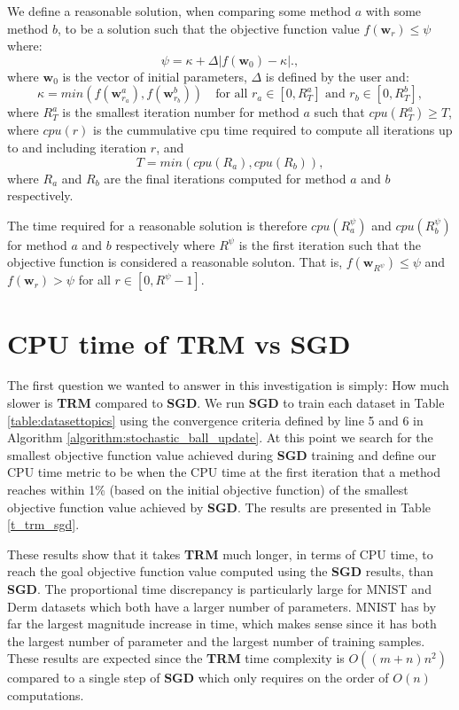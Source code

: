 \documentclass[letterpaper,12pt,titlepage,oneside,final]{book}
\begin{document}
	We define a reasonable solution, when comparing some method $a$ with some method $b$, to be a solution such that the objective function value $f(\mathbf{w}_{r}) \leq \psi$ where:
	\begin{equation}
	\psi = \kappa +  \Delta|f(\mathbf{w}_{0}) - \kappa|.,
	\end{equation}
	where $\mathbf{w}_{0}$ is the vector of initial parameters,  $\Delta$ is defined by the user and:
	\begin{equation}
	\kappa = min(f(\mathbf{w}^{a}_{r_{a}}),f(\mathbf{w}^{b}_{r_{b}})) \quad \text{for all } r_{a} \in [0,R^{a}_{T}] \text{ and } r_{b} \in [0,R^{b}_{T}],
	\end{equation}
	where $R^{a}_{T}$ is the smallest iteration number for method $a$ such that $cpu(R^{a}_{T}) \geq T$, where $cpu(r)$ is the cummulative cpu time required to compute all iterations up to and including iteration $r$, and
	\begin{equation}
	T = min(cpu(R_{a}),cpu(R_{b})),
	\end{equation}
	where $R_{a}$ and $R_{b}$ are the final iterations computed for method $a$ and $b$ respectively.
	
	The time required for a reasonable solution is therefore $cpu(R^{\psi}_{a})$ and $cpu(R^{\psi}_{b})$ for method $a$ and $b$ respectively where $R^{\psi}$ is the first iteration such that the objective function is considered a reasonable soluton. That is, $f(\mathbf{w}_{R^{\psi}}) \leq \psi$ and $f(\mathbf{w}_{r}) > \psi$ for all $r \in [0,R^{\psi} - 1]$.
		
	\section{CPU time of TRM vs SGD}
	
	The first question we wanted to answer in this investigation is simply: How much slower is \textbf{TRM} compared to \textbf{SGD}. We run \textbf{SGD} to train each dataset in Table \ref{table:datasettopics} using the convergence criteria defined by line 5 and 6 in Algorithm \ref{algorithm:stochastic_ball_update}. At this point we search for the smallest objective function value achieved during \textbf{SGD} training and define our CPU time metric to be when the CPU time at the first iteration that a method reaches within 1\% (based on the initial objective function) of the smallest objective function value achieved by \textbf{SGD}. The results are presented in Table \ref{t_trm_sgd}. 
	
	These results show that it takes \textbf{TRM} much longer, in terms of CPU time,
	to reach the goal objective function value computed using the \textbf{SGD} results, than \textbf{SGD}. The proportional time discrepancy is particularly large for MNIST and Derm datasets which both have a larger number of parameters. MNIST has by far the largest magnitude increase in time, which makes sense since it has both the largest number of parameter and the largest number of training samples.  These results are expected since the \textbf{TRM} time complexity is $O((m + n)n^{2})$ compared to a single step of $\textbf{SGD}$ which only requires on the order of $O(n)$ computations. 
	
\end{document}
